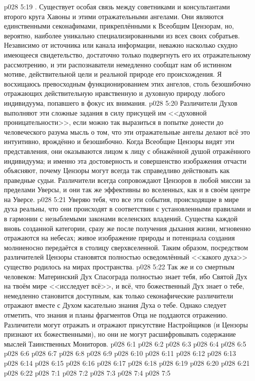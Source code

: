 \vs p028 5:19 . Существует особая связь между советниками и консультантами второго круга Хавоны и этими отражательными ангелами. Они являются единственными секонафимами, прикреплёнными к Всеобщим Цензорам, но, вероятно, наиболее уникально специализированными из всех своих собратьев. Независимо от источника или канала информации, неважно насколько скудно имеющееся свидетельство, достаточно только подвергнуть его их отражательному рассмотрению, и эти распознаватели немедленно сообщат нам об истинном мотиве, действительной цели и реальной природе его происхождения. Я восхищаюсь превосходным функционированием этих ангелов, столь безошибочно отражающих действительную нравственную и духовную природу любого индивидуума, попавшего в фокус их внимания.
\vs p028 5:20 Различители Духов выполняют эти сложные задания в силу присущей им <<духовной проницательности>>, если можно так выразиться в попытке донести до человеческого разума мысль о том, что эти отражательные ангелы делают всё это интуитивно, врождённо и безошибочно. Когда Всеобщие Цензоры видят эти представления, они оказываются лицом к лицу с обнажённой душой отражённого индивидуума; и именно эта достоверность и совершенство изображения отчасти объясняют, почему Цензоры могут всегда так справедливо действовать как праведные судьи. Различители всегда сопровождают Цензоров в любой миссии за пределами Уверсы, и они так же эффективны во вселенных, как и в своём центре на Уверсе.
\vs p028 5:21 Уверяю тебя, что все эти события, происходящие в мире духа реальны, что они происходят в соответствии с установленными правилами и в гармонии с незыблемыми законами вселенских владений. Существа каждой вновь созданной категории, сразу же после получения дыхания жизни, мгновенно отражаются на небесах; живое изображение природы и потенциала создания молниеносно передаётся в столицу сверхвселенной. Таким образом, посредством различителей Цензоры становятся полностью осведомлённый <<какого духа>> существо родилось на мирах пространства.
\vs p028 5:22 Так же и со смертным человеком: Материнский Дух Спасограда полностью знает тебя, ибо Святой Дух на твоём мире <<исследует всё>>, и всё, что божественный Дух знает о тебе, немедленно становится доступным, как только секонафические различители отражают вместе с Духом касательно знания Духа о тебе. Однако следует отметить, что знания и планы фрагментов Отца не поддаются отражению. Различители могут отражать и отражают присутствие Настройщиков (и Цензоры признают их божественными), но они не могут расшифровывать содержание мыслей Таинственных Мониторов.
\vs p028 6:1 
\vs p028 6:2 
\vs p028 6:3 
\vs p028 6:4 
\vs p028 6:5 
\vs p028 6:6 
\vs p028 6:7 
\vs p028 6:8 \pc 
\vs p028 6:9 
\vs p028 6:10 
\vs p028 6:11 
\vs p028 6:12 
\vs p028 6:13 
\vs p028 6:14 
\vs p028 6:15 \pc 
\vs p028 6:16 
\vs p028 6:17 
\vs p028 6:18 \pc 
\vs p028 6:19 \pc 
\vs p028 6:20 
\vs p028 6:21 
\vs p028 6:22 
\vs p028 7:1 
\vs p028 7:2 \pc 
\vs p028 7:3 
\vs p028 7:4 
\vsetoff
\vs p028 7:5 
\quizlink

